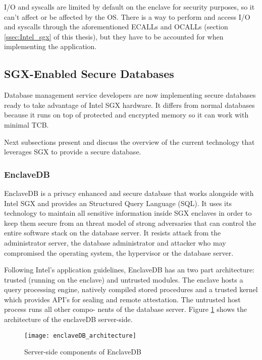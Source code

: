 \gls{I/O} and \gls{syscall}s are limited by default on the enclave for security purposes, so it can't affect or be affected by the \gls{OS}. There is a way to perform and access \gls{I/O} and \gls{syscall}s through the aforementioned \gls{ECALL}s and \gls{OCALL}s (section \ref{ssec:Intel_sgx} of this thesis), but they have to be accounted for when implementing the application.

\subsection{SGX-Enabled Secure Databases}
\label{ssec:sgx_enabled_secure_databases}

Database management service developers are now implementing secure databases ready to take advantage of Intel \gls{SGX} hardware. It differs from normal databases because it runs on top of protected and encrypted memory so it can work with minimal \gls{TCB}.

Next subsections present and discuss the overview of the current technology that leverages \gls{SGX} to provide a secure database.

\subsubsection{EnclaveDB}
\label{sssec:enclave_db}

EnclaveDB \cite{enclavedb:1} is a privacy enhanced and secure database that works alongside with Intel \gls{SGX} and provides an Structured Query Language (SQL). It uses its technology to maintain all sensitive information inside \gls{SGX} enclaves in order to keep them secure from an threat model of strong adversaries that can control the entire software stack  on the database server. It resists attack from the administrator server, the database administrator and attacker who may compromised the operating system, the hypervisor or the database server.

Following Intel's application guidelines, EnclaveDB has an two part architecture: trusted (running on the enclave) and untrusted modules. The enclave hosts a query processing engine, natively compiled stored procedures and a trusted kernel which provides API's for sealing and remote attestation. The untrusted host process runs all other compo- nents of the database server. Figure \ref{fig:enclaveDB_architecture} shows the architecture of the enclaveDB server-side.

\begin{figure}[htbp]
	\centering
	{\texttt{[image: enclaveDB\_architecture]}}%
	\caption{Server-side components of EnclaveDB}
	\label{fig:enclaveDB_architecture}
\end{figure}

